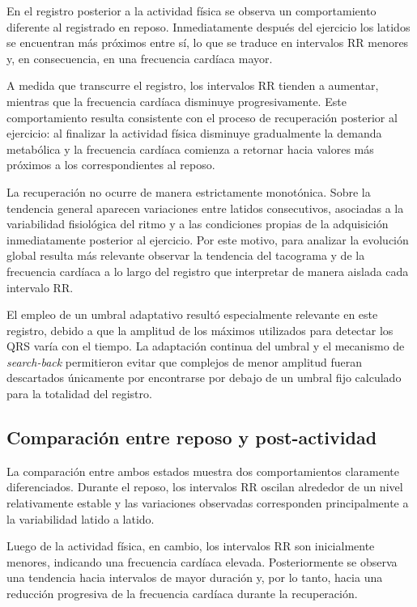 \documentclass[12pt,a4paper]{article}
\begin{document}
En el registro posterior a la actividad física se observa un comportamiento
diferente al registrado en reposo. Inmediatamente después del ejercicio los
latidos se encuentran más próximos entre sí, lo que se traduce en intervalos
RR menores y, en consecuencia, en una frecuencia cardíaca mayor.

A medida que transcurre el registro, los intervalos RR tienden a aumentar,
mientras que la frecuencia cardíaca disminuye progresivamente. Este
comportamiento resulta consistente con el proceso de recuperación posterior al
ejercicio: al finalizar la actividad física disminuye gradualmente la demanda
metabólica y la frecuencia cardíaca comienza a retornar hacia valores más
próximos a los correspondientes al reposo.

La recuperación no ocurre de manera estrictamente monotónica. Sobre la
tendencia general aparecen variaciones entre latidos consecutivos, asociadas a
la variabilidad fisiológica del ritmo y a las condiciones propias de la
adquisición inmediatamente posterior al ejercicio. Por este motivo, para
analizar la evolución global resulta más relevante observar la tendencia del
tacograma y de la frecuencia cardíaca a lo largo del registro que interpretar
de manera aislada cada intervalo RR.

El empleo de un umbral adaptativo resultó especialmente relevante en este
registro, debido a que la amplitud de los máximos utilizados para detectar los
QRS varía con el tiempo. La adaptación continua del umbral y el mecanismo de
\textit{search-back} permitieron evitar que complejos de menor amplitud fueran
descartados únicamente por encontrarse por debajo de un umbral fijo calculado
para la totalidad del registro.

\subsection{Comparación entre reposo y post-actividad}

La comparación entre ambos estados muestra dos comportamientos claramente
diferenciados. Durante el reposo, los intervalos RR oscilan alrededor de un
nivel relativamente estable y las variaciones observadas corresponden
principalmente a la variabilidad latido a latido.

Luego de la actividad física, en cambio, los intervalos RR son inicialmente
menores, indicando una frecuencia cardíaca elevada. Posteriormente se observa
una tendencia hacia intervalos de mayor duración y, por lo tanto, hacia una
reducción progresiva de la frecuencia cardíaca durante la recuperación.
\end{document}
